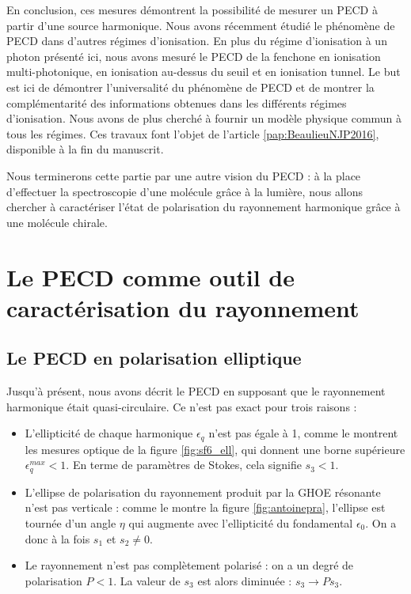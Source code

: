 En conclusion, ces mesures démontrent la possibilité de mesurer un PECD à partir d'une source harmonique. Nous avons récemment étudié le phénomène de PECD dans d'autres régimes d'ionisation. En plus du régime d'ionisation à un photon présenté ici, nous avons mesuré le PECD de la fenchone en ionisation multi-photonique, en ionisation au-dessus du seuil et en ionisation tunnel. Le but est ici de démontrer l'universalité du phénomène de PECD et de montrer la complémentarité des informations obtenues dans les différents régimes d'ionisation. Nous avons de plus cherché à fournir un modèle physique commun à tous les régimes. Ces travaux font l'objet de l'article \ref{pap:BeaulieuNJP2016}, disponible à la fin du manuscrit.

Nous terminerons cette partie par une autre vision du PECD : à la place d'effectuer la spectroscopie d'une molécule grâce à la lumière, nous allons chercher à caractériser l'état de polarisation du rayonnement harmonique grâce à une molécule chirale.

\chapter{Le PECD comme outil de caractérisation du rayonnement}
\section{Le PECD en polarisation elliptique}
Jusqu'à présent, nous avons décrit le PECD en supposant que le rayonnement harmonique était quasi-circulaire. Ce n'est pas exact pour trois raisons :

\begin{itemize}
\renewcommand{\labelitemi}{$\bullet$}
\setlength\itemsep{1em}
\item L'ellipticité de chaque harmonique $\epsilon_q$ n'est pas égale à 1, comme le montrent les mesures optique de la figure \ref{fig:sf6_ell}, qui donnent une borne supérieure $\epsilon_q^{max}<1$. En terme de paramètres de Stokes, cela signifie $s_3<1$.
\item L'ellipse de polarisation du rayonnement produit par la GHOE résonante n'est pas verticale : comme le montre la figure \ref{fig:antoinepra}, l'ellipse est tournée d'un angle $\eta$ qui augmente avec l'ellipticité du fondamental $\epsilon_0$. On a donc à la fois $s_1$ et $s_2\neq 0$.
\item Le rayonnement n'est pas complètement polarisé : on a un degré de polarisation $P<1$. La valeur de $s_3$ est alors diminuée : $s_3 \rightarrow Ps_3$.
\end{itemize}


